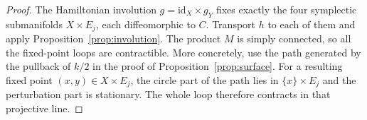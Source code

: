 \begin{proof}
The Hamiltonian involution $g=\mathrm{id}_X\times g_Y$ fixes exactly the four
symplectic submanifolds $X\times E_j$, each diffeomorphic to $C$.  Transport
$h$ to each of them and apply Proposition~\ref{prop:involution}.  The product
$M$ is simply connected, so all the fixed-point loops are contractible.
More concretely, use the path generated by the pullback of $k/2$ in the
proof of Proposition~\ref{prop:surface}.  For a resulting fixed point
$(x,y)\in X\times E_j$, the circle part of the path lies in $\{x\}\times E_j$ and the
perturbation part is stationary.  The whole loop therefore contracts in
that projective line.
\end{proof}

